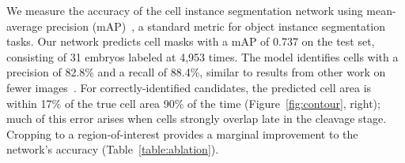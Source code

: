 
 We measure the accuracy of the cell instance segmentation network using mean-average precision (mAP)~\cite{lin2014microsoft}, a standard metric for object instance segmentation tasks. Our network predicts cell masks with a mAP of 0.737 on the test set, consisting of 31 embryos labeled at 4,953 times. The model identifies cells with a precision of 82.8\% and a recall of 88.4\%, similar to results from other work on fewer images~\cite{rad2018hybrid}. For correctly-identified candidates, the predicted cell area is within 17\% of the true cell area 90\% of the time (Figure~\ref{fig:contour}, right); much of this error arises when cells strongly overlap late in the cleavage stage. Cropping to a region-of-interest provides a marginal improvement to the network's accuracy (Table~\ref{table:ablation}).
